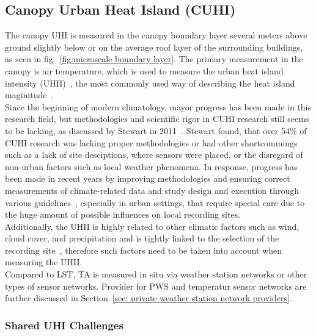 \subsection{Canopy Urban Heat Island (CUHI)}

The canopy UHI is measured in the canopy boundary layer several meters above ground slightly below or on the average roof layer of the surrounding buildings, as seen in fig.~\ref{fig:microscale boundary layer}. The primary measurement in the canopy is air temperature, which is used to measure the urban heat island intensity (UHII)~\cite{oke1973city}, the most commonly used way of describing the heat island maginitude~\cite{kim2021urban}.\\
Since the beginning of modern climatology, mayor progress has been made in this research field, but methodologies and scientific rigor in CUHI research still seems to be lacking, as discussed by Stewart in 2011~\cite{stewart2011systematic}. Stewart found, that over 54\% of CUHI research was lacking proper methodologies or had other shortcommings such as a lack of site desciptions, where sensors were placed, or the disregard of non-urban factors such as local weather phenomena. In response, progress has been made in recent years by improving methodologies and ensuring correct measurements of climate-related data and study design and execution through various guidelines~\cite{oke2006guideline}, especially in urban settings, that require special care due to the huge amount of possible influences on local recording sites.\\
Additionally, the UHII is highly related to other climatic factors such as wind, cloud cover, and precipitation and is tightly linked to the selection of the recording site~\cite{fenner2019contrasting}, therefore such factors need to be taken into account when measuring the UHII.\\
Compared to LST, TA is measured in situ via weather station networks or other types of sensor networks. Provider for PWS and temperatur sensor networks are further discussed in Section~\ref{sec: private weather station network providers}.

\subsubsection{Shared UHI Challenges}

